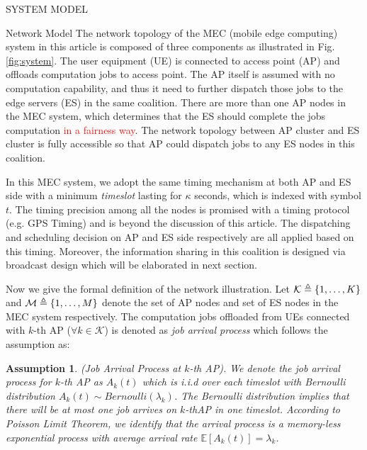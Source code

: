 \documentclass[10pt, conference, letterpaper]{IEEEtran}
\newtheorem{assumption}{Assumption}
\newcommand{\define}{\triangleq}
\DeclarePairedDelimiter{\set}{\{}{\}}
\newcommand{\apSet}{\mathcal{K}}
\begin{document}
    \begin{section}{SYSTEM MODEL}
        \label{sec:model}
        \begin{subsection}{Network Model}
            The network topology of the MEC (mobile edge computing) system in this article is composed of three components as illustrated in Fig. \ref{fig:system}.
            The user equipment (UE) is connected to access point (AP) and offloads computation jobs to access point. The AP itself is assumed with no computation capability, and thus it need to further dispatch those jobs to the edge servers (ES) in the same coalition. There are more than one AP nodes in the MEC system, which determines that the ES should complete the jobs computation \textcolor{red}{in a fairness way}. The network topology between AP cluster and ES cluster is fully accessible so that AP could dispatch jobs to any ES nodes in this coalition.

            In this MEC system, we adopt the same timing mechanism at both AP and ES side with a minimum \emph{timeslot} lasting for $\kappa$ seconds, which is indexed with symbol $t$. The timing precision among all the nodes is promised with a timing protocol (e.g. GPS Timing) and is beyond the discussion of this article. The dispatching and scheduling decision on AP and ES side respectively are all applied based on this timing. Moreover, the information sharing in this coalition is designed via broadcast design which will be elaborated in next section.

            Now we give the formal definition of the network illustration. Let $\apSet \define \set{1,\dots,K}$ and $\mathcal{M} \define \set{1,\dots,M}$ denote the set of AP nodes and set of ES nodes in the MEC system respectively. The computation jobs offloaded from UEs connected with $k$-th AP ($\forall k\in\apSet$) is denoted as \emph{job arrival process} which follows the assumption as:
            \begin{assumption}
                (Job Arrival Process at $k$-th AP).
                We denote the job arrival process for $k$-th AP as $A_k(t)$ which is i.i.d over each timeslot with Bernoulli distribution $A_k(t) \sim Bernoulli(\lambda_k)$. The Bernoulli distribution implies that there will be at most one job arrives on $k$-thAP in one timeslot. According to Poisson Limit Theorem, we identify that the arrival process is a memory-less exponential process with average arrival rate $\mathbb{E}[A_k(t)] = \lambda_k$.
            \end{assumption}
            

\end{subsection}
\end{section}
\end{document}
